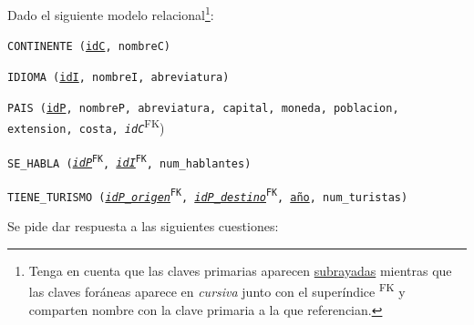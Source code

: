 \documentclass[
    12pt,
    a4paper,
    addpoints,
    answers,
    convocatoria=ord,
    titulacion=NoCD,
    curso=2025/2026,
]{db-exam}
\begin{document}
\begin{questions}
\newpage

\question[3] Dado el siguiente modelo relacional\footnote{Tenga en cuenta que las claves primarias aparecen \underline{subrayadas} mientras que las claves foráneas aparece en \textit{cursiva} junto con el superíndice \textsuperscript{FK} y comparten nombre con la clave primaria a la que referencian.}:

\texttt{CONTINENTE (\underline{idC}, nombreC)}

\texttt{IDIOMA (\underline{idI}, nombreI, abreviatura)}

\texttt{PAIS (\underline{idP}, nombreP, abreviatura, capital, moneda, poblacion, extension, costa, \textit{idC}}\textsuperscript{FK})

\texttt{SE\_HABLA (\underline{\textit{idP}}\textsuperscript{FK}, \underline{\textit{idI}}\textsuperscript{FK}, num\_hablantes)}

\texttt{TIENE\_TURISMO (\underline{\textit{idP\_origen}}\textsuperscript{FK}, \underline{\textit{idP\_destino}}\textsuperscript{FK}, \underline{año}, num\_turistas)}

Se pide dar respuesta a las siguientes cuestiones:

\end{questions}
\end{document}
